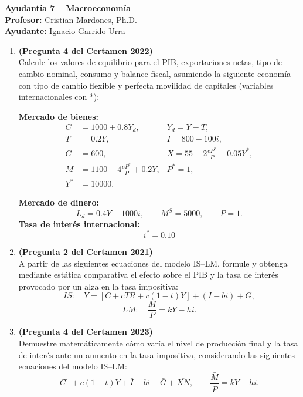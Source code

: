 \documentclass[11pt,addpoints]{article}
\begin{document}
\vspace*{0.1cm}
\begin{center}
\textbf{\LARGE Ayudantía 7 – Macroeconomía}\\[0.3cm]
\textbf{Profesor:} Cristian Mardones, Ph.D.\\
\textbf{Ayudante:} Ignacio Garrido Urra
\end{center}


\begin{enumerate}

\item \textbf{(Pregunta 4 del Certamen 2022)}\\[0.1cm]
Calcule los valores de equilibrio para el PIB, exportaciones netas, tipo de cambio nominal, consumo y balance fiscal, asumiendo la siguiente economía con tipo de cambio flexible y perfecta movilidad de capitales (variables internacionales con *):

\textbf{Mercado de bienes:}
\[
\begin{aligned}
C &= 1000 + 0.8Y_d,  &Y_d = Y - T,  \\
T &= 0.2Y, &I = 800 - 100i,\\
G &= 600,  &X = 55 + 2\frac{eP^*}{P} + 0.05Y^*,\\
M &= 1100 - 4\frac{eP^*}{P} + 0.2Y, &P^* = 1,\\
Y^* &= 10000.
\end{aligned}
\]

\textbf{Mercado de dinero:}
\[
L_d = 0.4Y - 1000i, \qquad M^S = 5000, \qquad P = 1.
\]
\textbf{Tasa de interés internacional:} 
\[
i^* = 0.10
\] 

\vspace{0.3cm}

\item \textbf{(Pregunta 2 del Certamen 2021)}\\[0.1cm]
A partir de las siguientes ecuaciones del modelo IS–LM, formule y obtenga mediante estática comparativa el efecto sobre el PIB y la tasa de interés provocado por un alza en la tasa impositiva:
\[
IS: \quad Y = [C + cTR + c(1 - t)Y] + (I - b i) + G,
\]
\[
LM: \quad \frac{M}{P} = kY - h i.
\]

\vspace{0.3cm}

\item \textbf{(Pregunta 4 del Certamen 2023)}\\[0.1cm]
Demuestre matemáticamente cómo varía el nivel de producción final y la tasa de interés ante un aumento en la tasa impositiva, considerando las siguientes ecuaciones del modelo IS–LM:
\[
C̅ + c(1 - t)Y + \bar{I} - b i + \bar{G} + \overline{XN},
\qquad
\frac{\bar{M}}{\bar{P}} = kY - h i.
\]




\end{enumerate}
\end{document}
